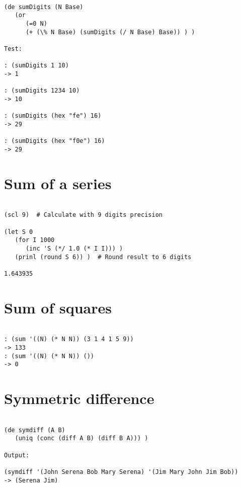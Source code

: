 \begin{verbatim}

(de sumDigits (N Base)
   (or
      (=0 N)
      (+ (\% N Base) (sumDigits (/ N Base) Base)) ) )

Test:

: (sumDigits 1 10)
-> 1

: (sumDigits 1234 10)
-> 10

: (sumDigits (hex "fe") 16)
-> 29

: (sumDigits (hex "f0e") 16)
-> 29

\end{verbatim}

\section*{Sum of a series}

\begin{verbatim}

(scl 9)  # Calculate with 9 digits precision

(let S 0
   (for I 1000
      (inc 'S (*/ 1.0 (* I I))) )
   (prinl (round S 6)) )  # Round result to 6 digits

1.643935

\end{verbatim}

\section*{Sum of squares}

\begin{verbatim}

: (sum '((N) (* N N)) (3 1 4 1 5 9))
-> 133
: (sum '((N) (* N N)) ())
-> 0

\end{verbatim}

\section*{Symmetric difference}

\begin{verbatim}

(de symdiff (A B)
   (uniq (conc (diff A B) (diff B A))) )

Output:

(symdiff '(John Serena Bob Mary Serena) '(Jim Mary John Jim Bob))
-> (Serena Jim)

\end{verbatim}

